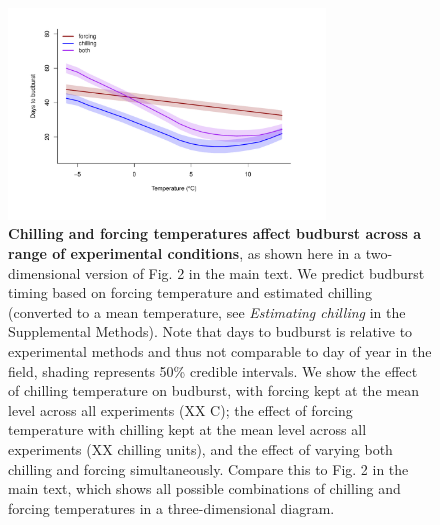 \documentclass{article}
\begin{document}
\begin{figure}[h!]
\centering
\noindent \includegraphics[width=0.75\textwidth]{..//..//analyses/bb_analysis/figures/mupredictschill_utah_pep.pdf}
\caption{\textbf{Chilling and forcing temperatures affect budburst across a range of experimental conditions}, as shown here in a two-dimensional version of Fig. 2 in the main text. We predict budburst timing based on forcing temperature and estimated chilling (converted to a mean temperature, see \emph{Estimating chilling} in the Supplemental Methods). Note that days to budburst is relative to experimental methods and thus not comparable to day of year in the field, shading represents 50\% credible intervals. We show the effect of chilling temperature on budburst, with forcing kept at the mean level across all experiments (XX \degree C);  the effect of forcing temperature with chilling kept at the mean level across all experiments (XX chilling units), and  the effect of varying both chilling and forcing simultaneously.  Compare  this to Fig. 2 in the main text, which shows all possible combinations of chilling and forcing temperatures in a three-dimensional diagram.}
\label{fig:2dfieldchillutah}
\end{figure}
\end{document}
